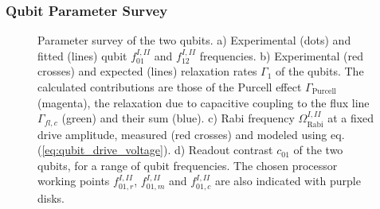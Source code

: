 \subsubsection{Qubit Parameter Survey} \label{section:qubit_parameter_survey}

\begin{figure}[p]
   \centering
	 \caption{Parameter survey of the two qubits. a) Experimental (dots) and fitted (lines) qubit $f_{01}^{I,II}$ and $f_{12}^{I,II}$ frequencies. b) Experimental (red crosses) and expected (lines) relaxation rates $\Gamma_1$ of the qubits. The calculated contributions are those of the Purcell effect $\Gamma_\mathrm{Purcell}$ (magenta), the relaxation due to capacitive coupling to the flux line $\Gamma_{fl,c}$ (green) and their sum (blue). c) Rabi frequency $\Omega_\mathrm{Rabi}^{I,II}$ at a fixed drive amplitude, measured (red crosses) and modeled using eq. (\ref{eq:qubit_drive_voltage}). d) Readout contrast $c_{01}$ of the two qubits, for a range of qubit frequencies. The chosen processor working points $f_{01,r}^{I,II}$, $f_{01,m}^{I,II}$ and $f_{01,c}^{I,II}$ are also indicated with purple disks.}
	 \label{fig:qubit_parameters}
\end{figure}

